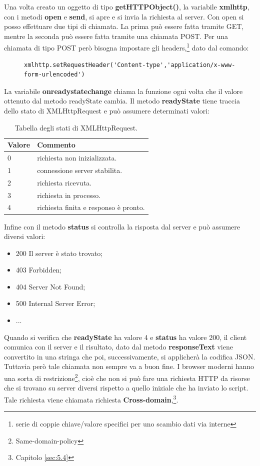 \documentclass[a4paper,11pt]{article}
\begin{document}
Una volta creato un oggetto di tipo \textbf{getHTTPObject()}, la variabile \textbf{xmlhttp}, con i metodi \textbf{open} e \textbf{send}, si apre e si invia la richiesta al server.\newline
Con open si posso effettuare due tipi di chiamata. La prima può essere fatta tramite GET, mentre la seconda può essere fatta tramite una chiamata POST. Per una chiamata di tipo POST però bisogna impostare gli headers,\footnote{serie di coppie chiave/valore specifici per uno scambio dati via interne} dato dal comando:
\begin{figure}[htb]
\begin{lstlisting}[style=htmlcssjs]
xmlhttp.setRequestHeader('Content-type','application/x-www-form-urlencoded')
\end{lstlisting}
\end{figure}\newline
La variabile \textbf{onreadystatechange} chiama la funzione ogni volta che il valore ottenuto dal metodo readyState cambia.
Il metodo \textbf{readyState} tiene traccia dello stato di XMLHttpRequest e può assumere determinati valori:
\begin{table}[htb]
\begin{center}				
\begin{tabular}{|>{\small}l|>{\small}l|}
	\hline	\textbf{Valore} & \textbf{Commento}\\				
	\hline	0 & richiesta non inizializzata.\\
	\hline	1 & connessione server stabilita.\\
	\hline	2 & richiesta ricevuta.\\
	\hline	3 & richiesta in processo.\\
	\hline	4 & richiesta finita e responso è pronto.\\
	\hline			
\end{tabular}	
\caption{Tabella degli stati di XMLHttpRequest.}	
\end{center}	
\end{table}\newpage
Infine con il metodo \textbf{status} si controlla la risposta dal server e può  assumere diversi valori:
\begin{itemize}
	\item 200 Il server è stato trovato;
	\item 403 Forbidden;
	\item 404 Server Not Found;
	\item 500 Internal Server Error;
	\item ...
\end{itemize}
Quando si verifica che \textbf{readyState} ha valore 4 e \textbf{status} ha valore 200, il client comunica con il server e il risultato, dato dal metodo \textbf{responseText} viene convertito in una stringa che poi, successivamente,  si applicherà la codifica JSON.
Tuttavia però tale chiamata non sempre va a buon fine. I browser moderni hanno una sorta di restrizione\footnote{Same-domain-policy}, cioè che non si può fare una richiesta HTTP da risorse che si trovano su server diversi rispetto a quello iniziale che ha inviato lo script.\newline
Tale richiesta viene chiamata richiesta \textbf{Cross-domain},\footnote{Capitolo \ref{sec:5.4}}.
\end{document}
